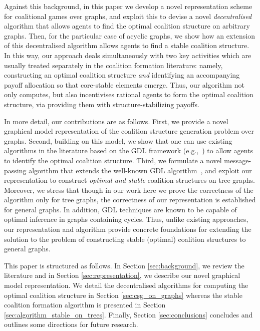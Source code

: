 \documentclass{aamas2012}
\begin{document}
Against this background, in this paper we 
develop a novel representation scheme for coalitional games over graphs, and
exploit this to devise a novel {\em decentralised} algorithm that allows agents to find
the optimal coalition structure on arbitrary
graphs. Then, for the particular case of acyclic graphs, we show how an
extension of this decentralised algorithm allows agents to find a stable
coalition structure. 
In this way, our approach deals simultaneously with two key activities 
which are usually treated separately in
the coalition formation literature: namely, constructing an optimal coalition
structure {\em and} identifying an accompanying payoff allocation so that core-stable
elements emerge. Thus, our algorithm not only computes, but also incentivises
rational agents to form the optimal coalition structure, via providing them with
structure-stabilizing payoffs.

In more detail, our contributions are as follows. 
First, we provide
a novel graphical model representation of the coalition structure generation
problem over graphs. Second, building on this model, we show that one can use
existing algorithms in the literature based on the GDL framework
(e.g.,~\cite{actiongdl,DBLP:journals/tit/AjiM00}) to allow agents to
identify the optimal coalition structure. Third, we formulate a novel
message-passing algorithm that extends the well-known
GDL algorithm~\cite{DBLP:journals/tit/AjiM00}, and exploit our
representation to construct {\em optimal and stable} coalition structures on
tree graphs. Moreover, we stress that though in our work here we prove the correctness of the algorithm only for tree graphs, 
 the correctness of our representation is established for general graphs.
 In addition, GDL techniques are known to be capable of optimal inference in graphs containing cycles.
 Thus, unlike existing approaches, our representation and algorithm 
 provide concrete foundations for extending the solution to the problem of
 constructing stable (optimal) coalition structures to general graphs.


This paper is structured as follows. In Section
\ref{sec:background}, we review the literature and in Section
\ref{sec:representation}, we describe our novel graphical model
representation. We detail the decentralised
algorithms for computing the optimal coalition structure in Section
\ref{sec:csg_on_graphs} whereas the stable coalition formation algorithm 
is presented in Section \ref{sec:algorithm_stable_on_trees}.
Finally, Section \ref{sec:conclusions} concludes and outlines some directions
for future research.
\end{document}
